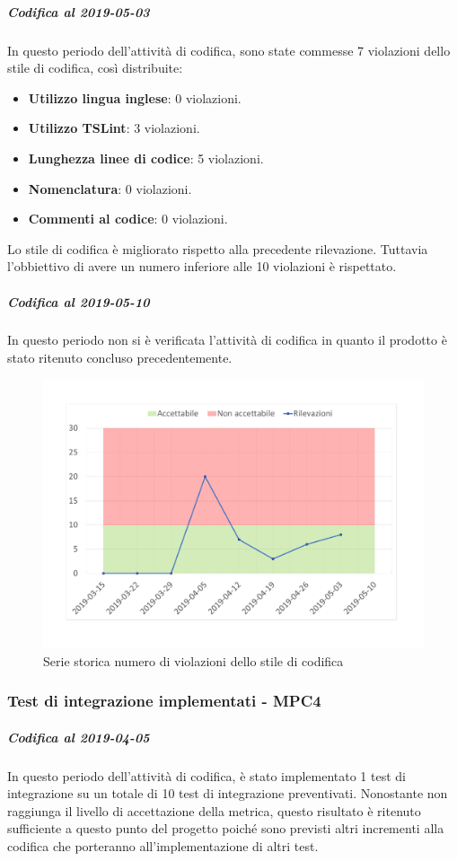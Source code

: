 \subparagraph{Codifica al 2019-05-03}
In questo periodo dell'attività di codifica, sono state commesse 7 violazioni dello stile di codifica, così distribuite:
 \begin{itemize}
 	\item \textbf{Utilizzo lingua inglese}: 0 violazioni.
 	\item \textbf{Utilizzo TSLint}: 3 violazioni.
 	\item \textbf{Lunghezza linee di codice}: 5 violazioni.
 	\item \textbf{Nomenclatura}: 0 violazioni.
 	\item \textbf{Commenti al codice}: 0 violazioni.
 \end{itemize}
Lo stile di codifica è migliorato rispetto alla precedente rilevazione. Tuttavia l'obbiettivo di avere un numero inferiore alle 10 violazioni è rispettato.

\subparagraph{Codifica al 2019-05-10}
In questo periodo non si è verificata l'attività di codifica in quanto il prodotto è stato ritenuto concluso precedentemente.

\begin{figure}[H]
	\centering
	\includegraphics[scale=0.6]{images/resoconto/MPC3Chart.pdf}
	\caption{Serie storica numero di violazioni dello stile di codifica}	
\end{figure}

\subsubsection{Test di integrazione implementati - MPC4}
\subparagraph{Codifica al 2019-04-05}
In questo periodo dell'attività di codifica, è stato implementato 1 test di integrazione su un totale di 10 test di integrazione preventivati.
Nonostante non raggiunga il livello di accettazione della
metrica, questo risultato è ritenuto sufficiente a questo punto del progetto poiché sono previsti altri incrementi alla codifica che porteranno all'implementazione di altri test.

